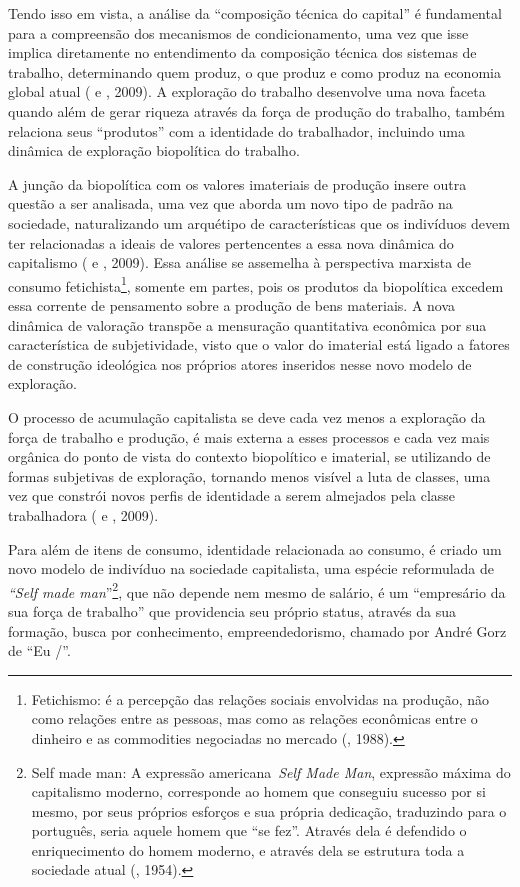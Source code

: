 Tendo isso em vista, a análise da ``composição técnica do capital'' é
fundamental para a compreensão dos mecanismos de condicionamento, uma
vez que isse implica diretamente no entendimento da composição técnica
dos sistemas de trabalho, determinando quem produz, o que produz e como
produz na economia global atual ( e , 2009). A exploração do
trabalho desenvolve uma nova faceta quando além de gerar riqueza através
da força de produção do trabalho, também relaciona seus ``produtos'' com
a identidade do trabalhador, incluindo uma dinâmica de exploração
biopolítica do trabalho.

A junção da biopolítica com os valores imateriais de produção insere
outra questão a ser analisada, uma vez que aborda um novo tipo de padrão
na sociedade, naturalizando um arquétipo de características que os
indivíduos devem ter relacionadas a ideais de valores pertencentes a
essa nova dinâmica do capitalismo ( e , 2009). Essa análise
se assemelha à perspectiva marxista de consumo fetichista\footnote{Fetichismo:
  é a percepção das relações sociais envolvidas na produção, não como
  relações entre as pessoas, mas como as relações econômicas entre o
  dinheiro e as commodities negociadas no mercado (, 1988).},
somente em partes, pois os produtos da biopolítica excedem essa corrente
de pensamento sobre a produção de bens materiais. A nova dinâmica de
valoração transpõe a mensuração quantitativa econômica por sua
característica de subjetividade, visto que o valor do imaterial está
ligado a fatores de construção ideológica nos próprios atores inseridos
nesse novo modelo de exploração.

O processo de acumulação capitalista se deve cada vez menos a exploração
da força de trabalho e produção, é mais externa a esses processos e cada
vez mais orgânica do ponto de vista do contexto biopolítico e imaterial,
se utilizando de formas subjetivas de exploração, tornando menos visível
a luta de classes, uma vez que constrói novos perfis de identidade a
serem almejados pela classe trabalhadora ( e , 2009).

Para além de itens de consumo, identidade relacionada ao consumo, é
criado um novo modelo de indivíduo na sociedade capitalista, uma espécie
reformulada de \emph{``Self made man}''\footnote{Self made man: A
  expressão americana~\emph{Self Made Man}, expressão máxima do
  capitalismo moderno, corresponde ao homem que conseguiu sucesso por si
  mesmo, por seus próprios esforços e sua própria dedicação, traduzindo
  para o português, seria aquele homem que ``se fez''. Através dela é
  defendido o enriquecimento do homem moderno, e através dela se
  estrutura toda a sociedade atual (, 1954).}, que não
depende nem mesmo de salário, é um ``empresário da sua força de
trabalho'' que providencia seu próprio status, através da sua formação,
busca por conhecimento, empreendedorismo, chamado por André Gorz de ``Eu
/''.

